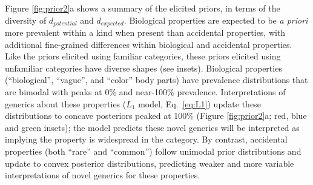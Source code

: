 \documentclass[12pt,letterpaper]{article}
\begin{document}
Figure \ref{fig:prior2}a shows a summary of the elicited priors, in terms of the diversity of $d_{potential}$ and $d_{expected}$.
Biological properties are expected to be \emph{a priori} more prevalent within a kind when present than accidental properties, with additional fine-grained differences within biological and accidental properties.
Like the priors elicited using familiar categories, these priors elicited using unfamiliar categories have diverse shapes (see insets). 
Biological properties (``biological'', ``vague'', and ``color'' body parts) have prevalence distributions that are bimodal with peaks at 0\% and near-100\% prevalence. 
Interpretations of generics about these properties ($L_1$ model, Eq.~\ref{eq:L1}) update these distributions to concave posteriors peaked at 100\% (Figure \ref{fig:prior2}a; red, blue and green insets); the model predicts these novel generics will be interpreted as implying the property is widespread in the category.
By contrast, accidental properties (both ``rare'' and ``common'') follow unimodal prior distributions and update to convex posterior distributions, predicting weaker and more variable interpretations of novel generics for these properties. 
\end{document}
